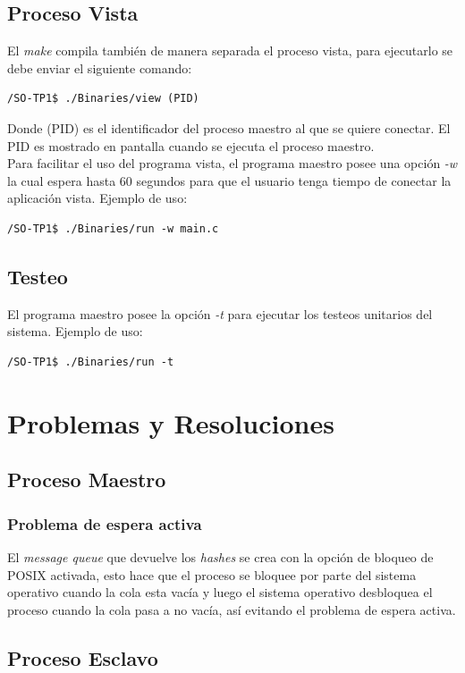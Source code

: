 \documentclass[10pt,a4paper]{report}
\begin{document}
\section{Proceso Vista}
El \textit{make} compila también de manera separada el proceso vista, para ejecutarlo se debe enviar el siguiente comando:
\begin{lstlisting}
/SO-TP1$ ./Binaries/view (PID)
\end{lstlisting}
Donde (PID) es el identificador del proceso maestro al que se quiere conectar. El PID es mostrado en pantalla cuando se ejecuta el proceso maestro. \\
\indent Para facilitar el uso del programa vista, el programa maestro posee una opción \textit{-w} la cual espera hasta 60 segundos para que el usuario tenga tiempo de conectar la aplicación vista. Ejemplo de uso:
\begin{lstlisting}
/SO-TP1$ ./Binaries/run -w main.c 
\end{lstlisting}

\section{Testeo}
El programa maestro posee la opción \textit{-t} para ejecutar los testeos unitarios del sistema. Ejemplo de uso:
\begin{lstlisting}
/SO-TP1$ ./Binaries/run -t
\end{lstlisting}

\chapter{Problemas y Resoluciones}
\section{Proceso Maestro}
\subsection{Problema de espera activa}
El \textit{message queue} que devuelve los \textit{hashes} se crea con la opción de bloqueo de POSIX activada, esto hace que el proceso se bloquee por parte del sistema operativo cuando la cola esta vacía y luego el sistema operativo desbloquea el proceso cuando la cola pasa a no vacía, así evitando el problema de espera activa.
\section{Proceso Esclavo}
\end{document}
